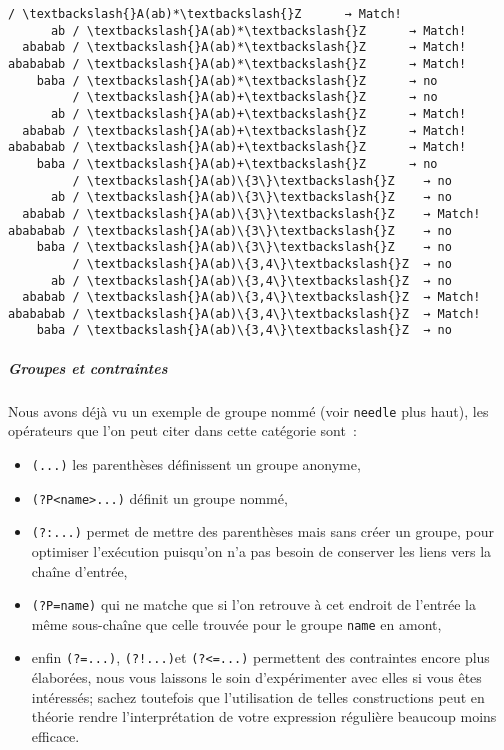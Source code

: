     \begin{Verbatim}[commandchars=\\\{\},frame=single,framerule=0.3mm,rulecolor=\color{cellframecolor}]
         / \textbackslash{}A(ab)*\textbackslash{}Z      → Match!
      ab / \textbackslash{}A(ab)*\textbackslash{}Z      → Match!
  ababab / \textbackslash{}A(ab)*\textbackslash{}Z      → Match!
abababab / \textbackslash{}A(ab)*\textbackslash{}Z      → Match!
    baba / \textbackslash{}A(ab)*\textbackslash{}Z      → no
         / \textbackslash{}A(ab)+\textbackslash{}Z      → no
      ab / \textbackslash{}A(ab)+\textbackslash{}Z      → Match!
  ababab / \textbackslash{}A(ab)+\textbackslash{}Z      → Match!
abababab / \textbackslash{}A(ab)+\textbackslash{}Z      → Match!
    baba / \textbackslash{}A(ab)+\textbackslash{}Z      → no
         / \textbackslash{}A(ab)\{3\}\textbackslash{}Z    → no
      ab / \textbackslash{}A(ab)\{3\}\textbackslash{}Z    → no
  ababab / \textbackslash{}A(ab)\{3\}\textbackslash{}Z    → Match!
abababab / \textbackslash{}A(ab)\{3\}\textbackslash{}Z    → no
    baba / \textbackslash{}A(ab)\{3\}\textbackslash{}Z    → no
         / \textbackslash{}A(ab)\{3,4\}\textbackslash{}Z  → no
      ab / \textbackslash{}A(ab)\{3,4\}\textbackslash{}Z  → no
  ababab / \textbackslash{}A(ab)\{3,4\}\textbackslash{}Z  → Match!
abababab / \textbackslash{}A(ab)\{3,4\}\textbackslash{}Z  → Match!
    baba / \textbackslash{}A(ab)\{3,4\}\textbackslash{}Z  → no
\end{Verbatim}

    \hypertarget{groupes-et-contraintes}{%
\subparagraph{Groupes et contraintes}\label{groupes-et-contraintes}}

    Nous avons déjà vu un exemple de groupe nommé (voir \texttt{needle} plus
haut), les opérateurs que l'on peut citer dans cette catégorie sont~:

\begin{itemize}
\tightlist
\item
  \texttt{(...)} les parenthèses définissent un groupe anonyme,
\item
  \texttt{(?P\textless{}name\textgreater{}...)} définit un groupe nommé,
\item
  \texttt{(?:...)} permet de mettre des parenthèses mais sans créer un
  groupe, pour optimiser l'exécution puisqu'on n'a pas besoin de
  conserver les liens vers la chaîne d'entrée,
\item
  \texttt{(?P=name)} qui ne matche que si l'on retrouve à cet endroit de
  l'entrée la même sous-chaîne que celle trouvée pour le groupe
  \texttt{name} en amont,
\item
  enfin \texttt{(?=...)}, \texttt{(?!...)}et \texttt{(?\textless{}=...)}
  permettent des contraintes encore plus élaborées, nous vous laissons
  le soin d'expérimenter avec elles si vous êtes intéressés; sachez
  toutefois que l'utilisation de telles constructions peut en théorie
  rendre l'interprétation de votre expression régulière beaucoup moins
  efficace.
\end{itemize}

